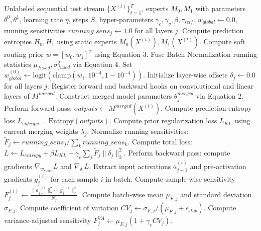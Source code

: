 \documentclass{article}
\theoremstyle{plain}
\theoremstyle{definition}
\theoremstyle{remark}
\begin{document}
\begin{algorithm}[tb]
  \caption{Variance-Aware Kronecker-Preconditioned Bayesian Consensus (VAKP-BC)}
  \label{alg:vakp_bc}
  \begin{algorithmic}[1]
     Unlabeled sequential test stream $\{X^{(t)}\}_{t=1}^T$, experts $M_0, M_1$ with parameters $\theta^0, \theta^1$, learning rate $\eta$, steps $S$, hyper-parameters $\gamma_c, \gamma_v, \beta, \tau_{self}$.
     $w_{global} \leftarrow 0.0$, running sensitivities $running\_sens_j \leftarrow 1.0$ for all layers $j$.
      \STATE Compute prediction entropies $H_0, H_1$ using static experts $M_0(X^{(t)}), M_1(X^{(t)})$.
      \STATE Compute soft routing prior $w = [w_0, w_1]^T$ using Equation 3.
      \STATE Fuse Batch Normalization running statistics $\mu_{fused}, \sigma^2_{fused}$ via Equation 4.
       Set $w_{global}^{(0)} \leftarrow \text{logit}(\text{clamp}(w_1, 10^{-4}, 1 - 10^{-4}))$.
      \STATE Initialize layer-wise offsets $\delta_j \leftarrow 0.0$ for all layers $j$.
        \STATE Register forward and backward hooks on convolutional and linear layers of $M^{merged}$.
        \STATE Construct merged model parameters $\theta^{merged}_j$ via Equation 2.
        \STATE Perform forward pass: $outputs \leftarrow M^{merged}(X^{(t)})$.
        \STATE Compute prediction entropy loss $L_{entropy} = \text{Entropy}(outputs)$.
        \STATE Compute prior regularization loss $L_{KL}$ using current merging weights $\lambda_j$.
        \STATE Normalize running sensitivities: $\tilde{F}_j \leftarrow running\_sens_j / \sum_k running\_sens_k$.
        \STATE Compute total loss: $L \leftarrow L_{entropy} + \beta L_{KL} + \gamma_c \sum_j \tilde{F}_j \|\delta_j\|_2^2$.
        \STATE Perform backward pass: compute gradients $\nabla_{w_{global}} L$ and $\nabla_{\delta_j} L$.
          \STATE Extract input activations $a_{j-1}^{(i)}$ and pre-activation gradients $g_j^{(i)}$ for each sample $i$ in batch.
          \STATE Compute sample-wise sensitivity $F_j^{(i)} \leftarrow \frac{\|a_{j-1}^{(i)}\|_2^2 \cdot \|g_j^{(i)}\|_2^2}{N_j}$.
          \STATE Compute batch-wise mean $\mu_{F, j}$ and standard deviation $\sigma_{F, j}$.
          \STATE Compute coefficient of variation $CV_j \leftarrow \sigma_{F, j} / (\mu_{F, j} + \epsilon_{stab})$.
          \STATE Compute variance-adjusted sensitivity $F_j^{VA} \leftarrow \mu_{F, j} (1 + \gamma_v CV_j)$.

\end{algorithmic}
\end{algorithm}
\end{document}
